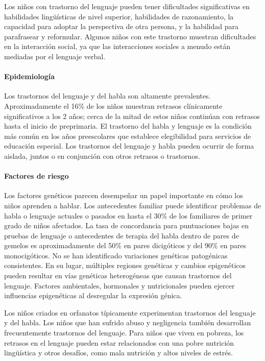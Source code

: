 \documentclass[11pt,letterpaper]{report}
\begin{document}
Los niños con trastorno del lenguaje pueden tener dificultades significativas
en habilidades lingüísticas de nivel superior, habilidades de razonamiento, la
capacidad para adoptar la perspectiva de otra persona, y la habilidad para
parafrasear y reformular. Algunos niños con este trastorno muestran dificultades
en la interacción social, ya que las interacciones sociales a menudo están
mediadas por el lenguaje verbal. \cite{Nelson53}

\paragraph{Epidemiología}
Los trastornos del lenguaje y del habla son altamente prevalentes.
Aproximadamente el 16\% de los niños muestran retrasos clínicamente
significativos a los 2 años; cerca de la mitad de estos niños continúan
con retrasos hasta el inicio de preprimaria. El trastorno del habla y lenguaje
es la condición más común en los años preescolares que establece elegibilidad
para servicios de educación especial. Los trastornos del lenguaje y habla
pueden ocurrir de forma aislada, juntos o en conjunción con otros retrasos o
trastornos. \cite{Feldman44}

\paragraph{Factores de riesgo}
Los factores genéticos parecen desempeñar un papel importante en cómo los niños
aprenden a hablar. Los antecedentes familiar puede identificar problemas de
habla o lenguaje actuales o pasados en hasta el 30\% de los familiares de
primer grado de niños afectados. La tasa de concordancia para puntuaciones
bajas en pruebas de lenguaje o antecedentes de terapia del habla dentro de
pares de gemelos es aproximadamente del 50\% en pares dicigóticos y del 90\%
en pares monocigóticos. No se han identificado variaciones genéticas
patogénicas consistentes. En su lugar, múltiples regiones genéticas y cambios
epigenéticos pueden resultar en vías genéticas heterogéneas que causan
trastornos del lenguaje. Factores ambientales, hormonales y nutricionales
pueden ejercer influencias epigenéticas al desregular la expresión génica.
\cite{Nelson53}

Los niños criados en orfanatos típicamente experimentan trastornos del
lenguaje y del habla. Los niños que han sufrido abuso y negligencia también
desarrollan frecuentemente trastornos del lenguaje. Para niños que viven en
pobreza, los retrasos en el lenguaje pueden estar relacionados con una pobre
nutrición lingüística y otros desafíos, como mala nutrición y altos niveles
de estrés. \cite{Feldman44}
\end{document}
